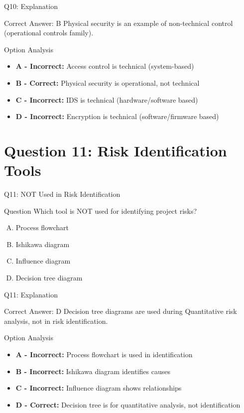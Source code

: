 \documentclass{beamer}
\begin{document}
	\begin{frame}{Q10: Explanation}
		\begin{block}{Correct Answer: B}
			Physical security is an example of non-technical control (operational controls family).
		\end{block}
		\begin{block}{Option Analysis}
			\begin{itemize}
				\item \textbf{A - Incorrect:} Access control is technical (system-based)
				\item \textbf{B - Correct:} Physical security is operational, not technical
				\item \textbf{C - Incorrect:} IDS is technical (hardware/software based)
				\item \textbf{D - Incorrect:} Encryption is technical (software/firmware based)
			\end{itemize}
		\end{block}
	\end{frame}
	
	\section{Question 11: Risk Identification Tools}
	
	\begin{frame}{Q11: NOT Used in Risk Identification}
		\begin{block}{Question}
			Which tool is NOT used for identifying project risks?
		\end{block}
		\begin{enumerate}[(A)]
			\item Process flowchart
			\item Ishikawa diagram
			\item Influence diagram
			\item Decision tree diagram
		\end{enumerate}
	\end{frame}
	
	\begin{frame}{Q11: Explanation}
		\begin{block}{Correct Answer: D}
			Decision tree diagrams are used during Quantitative risk analysis, not in risk identification.
		\end{block}
		\begin{block}{Option Analysis}
			\begin{itemize}
				\item \textbf{A - Incorrect:} Process flowchart is used in identification
				\item \textbf{B - Incorrect:} Ishikawa diagram identifies causes
				\item \textbf{C - Incorrect:} Influence diagram shows relationships
				\item \textbf{D - Correct:} Decision tree is for quantitative analysis, not identification
			\end{itemize}
		\end{block}
	\end{frame}
	
\end{document}

